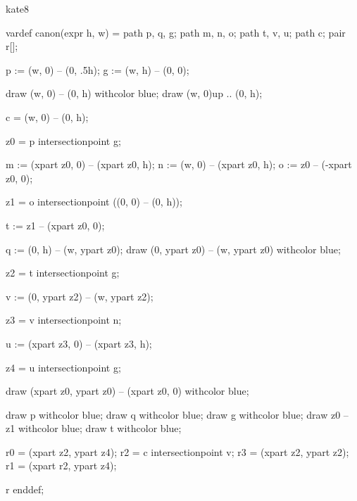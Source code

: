

\startenvironment kate8

	\startMPdefinitions
		vardef canon(expr h, w) =
			path p, q, g;
			path m, n, o;
			path t, v, u;
			path c;
			pair r[];

			p := (w, 0) -- (0, .5h); %
			g := (w, h) -- (0, 0); %

			draw (w, 0) -- (0, h) withcolor blue;
			draw (w, 0){up} .. (0, h); %

			c = (w, 0) -- (0, h);

			z0 = p intersectionpoint g; %

			m := (xpart z0, 0) -- (xpart z0, h); %
			n := (w, 0) -- (xpart z0, h); %
			o := z0 -- (-xpart z0, 0); %

			z1 = o intersectionpoint ((0, 0) -- (0, h)); %

			t := z1 -- (xpart z0, 0); %

			q := (0, h) -- (w, ypart z0); %
			draw (0, ypart z0) -- (w, ypart z0) withcolor blue;

			z2 = t intersectionpoint g; %

			v := (0, ypart z2) -- (w, ypart z2); %

			z3 = v intersectionpoint n; %

			u := (xpart z3, 0) -- (xpart z3, h); %

			z4 = u intersectionpoint g; %

			draw (xpart z0, ypart z0) -- (xpart z0, 0) withcolor blue;

			draw p withcolor blue;
			draw q withcolor blue;
			draw g withcolor blue;
			draw z0 -- z1 withcolor blue;
			draw t withcolor blue;

			r0 = (xpart z2, ypart z4); %
			r2 = c intersectionpoint v; %
			r3 = (xpart z2, ypart z2); %
			r1 = (xpart r2, ypart z4); %

			r
		enddef;

	\stopMPdefinitions

\stopenvironment

